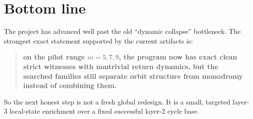 \documentclass[11pt]{article}
\begin{document}
\section*{Bottom line}

The project has advanced well past the old ``dynamic collapse'' bottleneck. The strongest exact statement supported by the current artifacts is:

\begin{quote}
\textbf{on the pilot range $m=5,7,9$, the program now has exact clean strict witnesses with nontrivial return dynamics, but the searched families still separate orbit structure from monodromy instead of combining them.}
\end{quote}

So the next honest step is not a fresh global redesign. It is a small, targeted layer-3 local-state enrichment over a fixed successful layer-2 cycle base.
\end{document}
